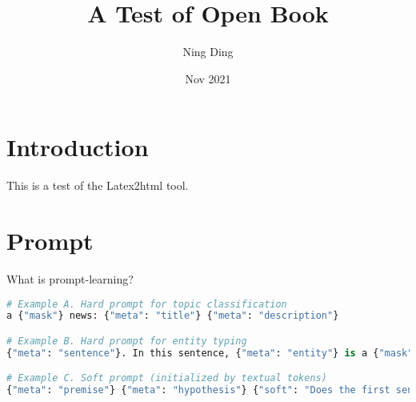 \documentclass{article}
\title{A Test of Open Book}
\author{Ning Ding}
\date{Nov 2021}
\begin{document}
\maketitle

\section{Introduction}

This is a test of the Latex2html tool.

\section{Prompt}

What is prompt-learning?


\begin{figure*}[!thp]
\centering
\begin{minipage}{0.999\linewidth}
\begin{lstlisting}[language=Python]
# Example A. Hard prompt for topic classification
a {"mask"} news: {"meta": "title"} {"meta": "description"}

# Example B. Hard prompt for entity typing
{"meta": "sentence"}. In this sentence, {"meta": "entity"} is a {"mask"},

# Example C. Soft prompt (initialized by textual tokens)
{"meta": "premise"} {"meta": "hypothesis"} {"soft": "Does the first sentence entails the second ?"} {"mask"} {"soft"}.


\end{lstlisting}
\end{minipage} 
\caption{ Some examples of our template language. In our template language, we can use the key ``meta'' to refer the original input text (Example B), parts of the original input (Example A, C, G), or other key information. We can also freely specify which tokens are hard and which are soft (and their initialization strategy). We could assign an id for a soft token to specify which tokens are sharing embeddings (Example F). OpenPrompt also supports the post processing (Example E) for each token, e.g., lambda expression or MLP.
}

\label{fig:code_template} 
\end{figure*}
\end{document}
